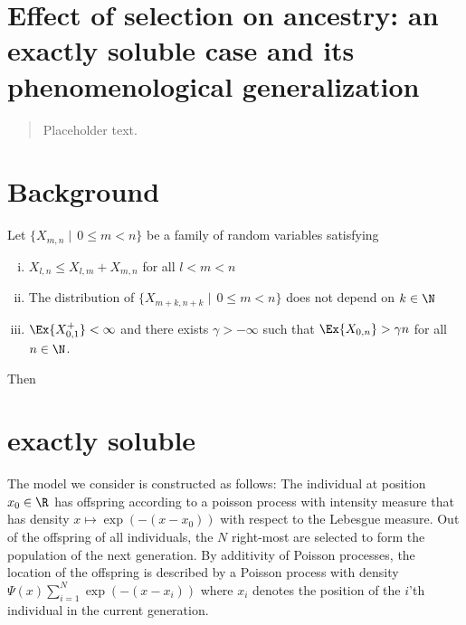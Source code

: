 \section{Effect of selection on ancestry: an exactly soluble case and its phenomenological generalization}\label{dec:}

\begin{quote}
{\small Placeholder text. }
\end{quote}

\section{Background}
\begin{theorem}
Let $\{X_{m,n} \mid\, 0 \leq m < n\}$ be a family of random variables satisfying 
\begin{enumerate}[(i)]
\item $X_{l,n} \leq X_{l,m} + X_{m, n}$ for all $l < m < n$
\item The distribution of $\{X_{m + k, n + k} \mid\, 0 \leq m < n\}$ does not depend on $k \in \N$
\item $\Ex{X_{0,1}^+} < \infty$ and there exists $\gamma > -\infty$ such that $\Ex{X_{0,n}} > \gamma n$ for all $n \in \N$. 
\end{enumerate}
Then 
\end{theorem}

\section{exactly soluble}
The model we consider is constructed as follows: The individual at position $x_0 \in \R$ has offspring according to a poisson process with intensity measure that has density $x \mapsto \exp(- (x - x_0))$ with respect to the Lebesgue measure. Out of the offspring of all individuals, the $N$ right-most are selected to form the population of the next generation. By additivity of Poisson processes, the location of the offspring is described by a Poisson process with density $\Psi(x) \sum\limits_{i = 1}^N \exp(-(x - x_i))$ where $x_i$ denotes the position of the $i$'th individual in the current generation. 


